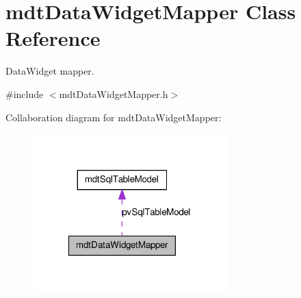 \hypertarget{classmdt_data_widget_mapper}{
\section{mdtDataWidgetMapper Class Reference}
\label{classmdt_data_widget_mapper}
}


DataWidget mapper.  




{\ttfamily \#include $<$mdtDataWidgetMapper.h$>$}



Collaboration diagram for mdtDataWidgetMapper:\nopagebreak
\begin{figure}[H]
\begin{center}
\leavevmode
\includegraphics[width=214pt]{classmdt_data_widget_mapper__coll__graph}
\end{center}
\end{figure}
